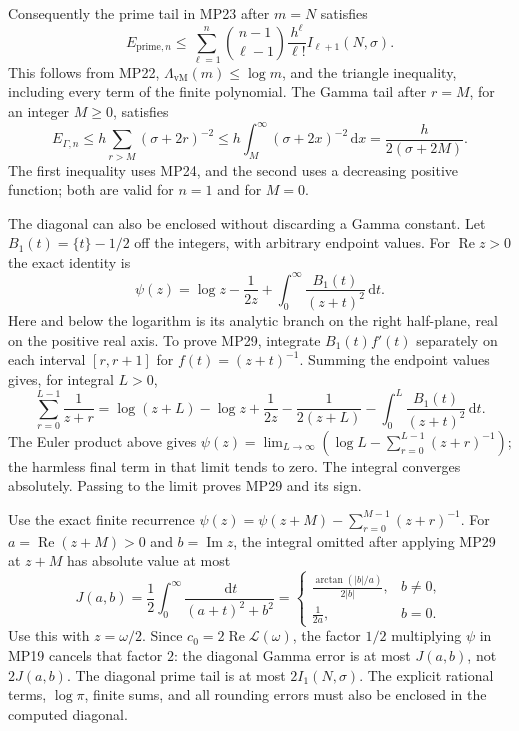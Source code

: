 \documentclass[11pt]{article}
\newcommand{\LL}{\mathscr L}
\newcommand{\dd}{\,\mathrm d}
\newcommand{\Rea}{\operatorname{Re}}
\newcommand{\Ima}{\operatorname{Im}}
\newcommand{\vM}{\Lambda_{\mathrm{vM}}}
\begin{document}
Consequently the prime tail in MP23 after $m=N$ satisfies
\begin{equation}
 E_{\mathrm{prime},n}\leq
 \sum_{\ell=1}^n\binom{n-1}{\ell-1}\frac{h^\ell}{\ell!}
                                     I_{\ell+1}(N,\sigma).
 \tag{MP27}
\end{equation}
This follows from MP22, $\vM(m)\leq\log m$, and the triangle inequality,
including every term of the finite polynomial. The Gamma tail after
$r=M$, for an integer $M\geq0$, satisfies
\begin{equation}
 E_{\Gamma,n}\leq h\sum_{r>M}(\sigma+2r)^{-2}
       \leq h\int_M^\infty(\sigma+2x)^{-2}\dd x
       =\frac h{2(\sigma+2M)}.\tag{MP28}
\end{equation}
The first inequality uses MP24, and the second uses a decreasing positive
function; both are valid for $n=1$ and for $M=0$.

The diagonal can also be enclosed without discarding a Gamma constant.
Let $B_1(t)=\{t\}-1/2$ off the integers, with arbitrary endpoint values.
For $\Rea z>0$ the exact identity is
\begin{equation}
 \psi(z)=\log z-\frac1{2z}
       +\int_0^\infty\frac{B_1(t)}{(z+t)^2}\dd t.
 \tag{MP29}
\end{equation}
Here and below the logarithm is its analytic branch on the right
half-plane, real on the positive real axis. To prove MP29, integrate
$B_1(t)f'(t)$ separately on each interval $[r,r+1]$ for
$f(t)=(z+t)^{-1}$. Summing the endpoint values gives, for integral $L>0$,
\[
 \sum_{r=0}^{L-1}\frac1{z+r}
 =\log(z+L)-\log z+\frac1{2z}-\frac1{2(z+L)}
                  -\int_0^L\frac{B_1(t)}{(z+t)^2}\dd t.
\]
The Euler product above gives
$\psi(z)=\lim_{L\to\infty}(\log L-\sum_{r=0}^{L-1}(z+r)^{-1})$;
the harmless final term in that limit tends to zero. The integral
converges absolutely. Passing to the limit proves MP29 and its sign.

Use the exact finite recurrence
$\psi(z)=\psi(z+M)-\sum_{r=0}^{M-1}(z+r)^{-1}$.
For $a=\Rea(z+M)>0$ and $b=\Ima z$, the integral omitted after applying
MP29 at $z+M$ has absolute value at most
\begin{equation}
 J(a,b)=\frac12\int_0^\infty\frac{\dd t}{(a+t)^2+b^2}
 =\begin{cases}
 \displaystyle\frac{\arctan(|b|/a)}{2|b|},&b\ne0,\\[5pt]
 \displaystyle\frac1{2a},&b=0.
 \end{cases}\tag{MP30}
\end{equation}
Use this with $z=\omega/2$. Since $c_0=2\Rea\LL(\omega)$, the
factor $1/2$ multiplying $\psi$ in MP19 cancels that factor $2$:
the diagonal Gamma error is at most $J(a,b)$, not $2J(a,b)$.
The diagonal prime tail is at most $2I_1(N,\sigma)$.
The explicit rational terms, $\log\pi$, finite sums, and all rounding
errors must also be enclosed in the computed diagonal.
\end{document}

